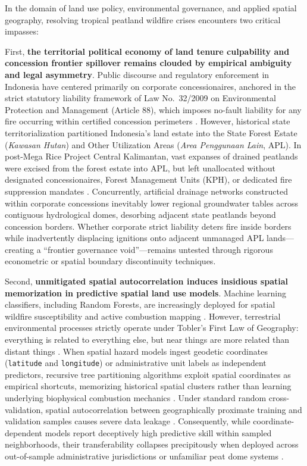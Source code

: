 In the domain of land use policy, environmental governance, and applied spatial geography, resolving tropical peatland wildfire crises encounters two critical impasses:

First, \textbf{the territorial political economy of land tenure culpability and concession frontier spillover remains clouded by empirical ambiguity and legal asymmetry}. Public discourse and regulatory enforcement in Indonesia have centered primarily on corporate concessionaires, anchored in the strict statutory liability framework of Law No.~32/2009 on Environmental Protection and Management (Article 88), which imposes no-fault liability for any fire occurring within certified concession perimeters \citep{Tacconi2003CIFOR, Carlson2012PNAS}. However, historical state territorialization partitioned Indonesia's land estate into the State Forest Estate (\textit{Kawasan Hutan}) and Other Utilization Areas (\textit{Area Penggunaan Lain}, APL). In post-Mega Rice Project Central Kalimantan, vast expanses of drained peatlands were excised from the forest estate into APL, but left unallocated without designated concessionaires, Forest Management Units (KPH), or dedicated fire suppression mandates \citep{Cattau2016GCB, Putranto2023LandUsePol}. Concurrently, artificial drainage networks constructed within corporate concessions inevitably lower regional groundwater tables across contiguous hydrological domes, desorbing adjacent state peatlands beyond concession borders. Whether corporate strict liability deters fire inside borders while inadvertently displacing ignitions onto adjacent unmanaged APL lands---creating a ``frontier governance void''---remains untested through rigorous econometric or spatial boundary discontinuity techniques.

Second, \textbf{unmitigated spatial autocorrelation induces insidious spatial memorization in predictive spatial land use models}. Machine learning classifiers, including Random Forests, are increasingly deployed for spatial wildfire susceptibility and active combustion mapping \citep{Breiman2001ML}. However, terrestrial environmental processes strictly operate under Tobler's First Law of Geography: everything is related to everything else, but near things are more related than distant things \citep{Tobler1970EconGeogr, Legendre1993Ecology}. When spatial hazard models ingest geodetic coordinates (\texttt{latitude} and \texttt{longitude}) or administrative unit labels as independent predictors, recursive tree partitioning algorithms exploit spatial coordinates as empirical shortcuts, memorizing historical spatial clusters rather than learning underlying biophysical combustion mechanics \citep{Meyer2018EcolModel, Dormann2007Ecography}. Under standard random cross-validation, spatial autocorrelation between geographically proximate training and validation samples causes severe data leakage \citep{Roberts2017Ecography, Wadoux2021EcolModel}. Consequently, while coordinate-dependent models report deceptively high predictive skill within sampled neighborhoods, their transferability collapses precipitously when deployed across out-of-sample administrative jurisdictions or unfamiliar peat dome systems \citep{MeyerPebesma2021NatComm, Schratz2019EcolModel}.

